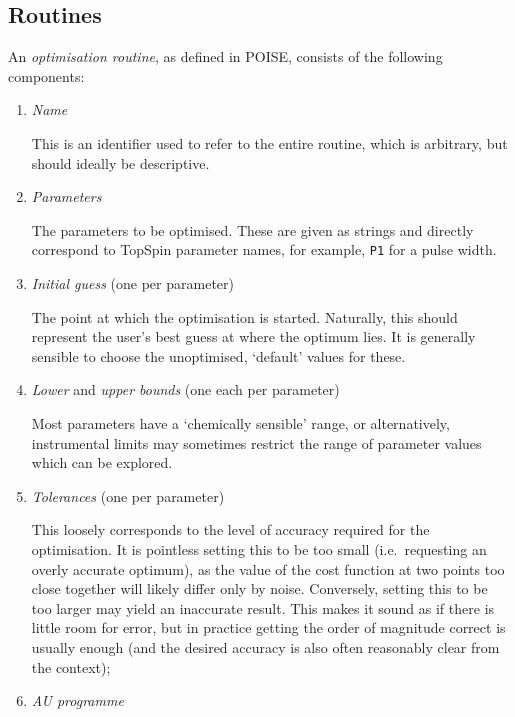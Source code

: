 \subsection{Routines}
\label{subsec:poise__routines}

An \textit{optimisation routine}, as defined in POISE, consists of the following components:

\begin{enumerate}
    \item \textit{Name}

        This is an identifier used to refer to the entire routine, which is arbitrary, but should ideally be descriptive.

    \item \textit{Parameters}

        The parameters to be optimised.
        These are given as strings and directly correspond to TopSpin parameter names, for example, \texttt{P1} for a pulse width.

    \item \textit{Initial guess} (one per parameter)

        The point at which the optimisation is started.
        Naturally, this should represent the user's best guess at where the optimum lies.
        It is generally sensible to choose the unoptimised, `default' values for these.
        
    \item \textit{Lower} and \textit{upper bounds} (one each per parameter)

        Most parameters have a `chemically sensible' range, or alternatively, instrumental limits may sometimes restrict the range of parameter values which can be explored.

    \item \textit{Tolerances} (one per parameter)

        This loosely corresponds to the level of accuracy required for the optimisation.
        It is pointless setting this to be too small (i.e.\ requesting an overly accurate optimum), as the value of the cost function at two points too close together will likely differ only by noise.
        Conversely, setting this to be too larger may yield an inaccurate result.
        This makes it sound as if there is little room for error, but in practice getting the order of magnitude correct is usually enough (and the desired accuracy is also often reasonably clear from the context);

    \item \textit{AU programme}


\end{enumerate}
